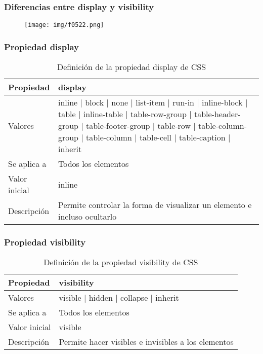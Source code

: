 
\begin{frame}
\frametitle{Diferencias entre display y visibility}

\begin{center}
\begin{figure}[p]
\texttt{[image: img/f0522.png]}
\end{figure}
\end{center}

\end{frame}



\begin{frame}
\frametitle{Propiedad display}

\begin{center}
  \begin{table}
   \begin{tabular}{p{1.8cm}p{7.8cm}}
Propiedad & \bf{display} \\ \hline
Valores& inline | block | none | list-item | run-in | inline-block | table | inline-table | table-row-group | table-header-group | table-footer-group | table-row | table-column-group | table-column | table-cell | table-caption | inherit \\ \hline
Se aplica a& Todos los elementos \\ \hline
Valor inicial& inline \\ \hline
Descripción& Permite controlar la forma de visualizar un elemento e incluso ocultarlo \\ \hline
  \end{tabular}
   \caption{Definición de la propiedad display de CSS}
 \end{table}
\end{center}


\end{frame}





\begin{frame}
\frametitle{Propiedad visibility}

\begin{center}
  \begin{table}
   \begin{tabular}{p{1.8cm}p{7.8cm}}
Propiedad & \bf{visibility} \\ \hline
Valores& visible | hidden | collapse | inherit \\ \hline
Se aplica a& Todos los elementos \\ \hline
Valor inicial& visible \\ \hline
Descripción& Permite hacer visibles e invisibles a los elementos \\ \hline
  \end{tabular}
   \caption{Definición de la propiedad visibility de CSS}
 \end{table}
\end{center}


\end{frame}


